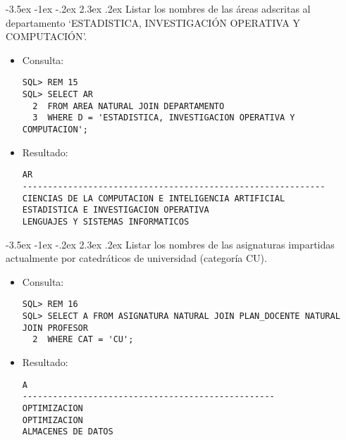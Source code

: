 \documentclass[11pt]{report}
\makeatletter
\renewcommand\chapter{\@startsection{chapter}{0}{\z@}%
    {-3.5ex \@plus -1ex \@minus -.2ex}%
    {2.3ex \@plus.2ex}%
    {\normalfont\Large\bfseries}}
\makeatother
\begin{document}
\chapter{Listar los nombres de las áreas adscritas al departamento ‘ESTADISTICA, INVESTIGACIÓN OPERATIVA Y COMPUTACIÓN’.}
\begin{itemize}
  \item Consulta:
  \begin{verbatim}
SQL> REM 15
SQL> SELECT AR
  2  FROM AREA NATURAL JOIN DEPARTAMENTO
  3  WHERE D = 'ESTADISTICA, INVESTIGACION OPERATIVA Y COMPUTACION';
  \end{verbatim}
  \item{Resultado:}
  \begin{verbatim}
AR                                                                              
------------------------------------------------------------                    
CIENCIAS DE LA COMPUTACION E INTELIGENCIA ARTIFICIAL                            
ESTADISTICA E INVESTIGACION OPERATIVA                                           
LENGUAJES Y SISTEMAS INFORMATICOS  
  \end{verbatim}
\end{itemize}

\chapter{Listar los nombres de las asignaturas impartidas actualmente por catedráticos de universidad (categoría CU).}
\begin{itemize}
  \item Consulta:
  \begin{verbatim}
SQL> REM 16
SQL> SELECT A FROM ASIGNATURA NATURAL JOIN PLAN_DOCENTE NATURAL JOIN PROFESOR
  2  WHERE CAT = 'CU';
  \end{verbatim}
  \item{Resultado:}
  \begin{verbatim}
A                                                                               
--------------------------------------------------                              
OPTIMIZACION                                                                    
OPTIMIZACION                                                                    
ALMACENES DE DATOS 
  \end{verbatim}
\end{itemize}
\end{document}
